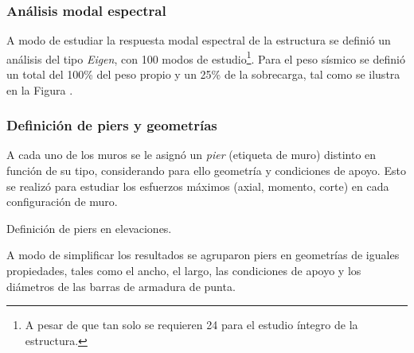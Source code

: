 \subsubsection{Análisis modal espectral}

    A modo de estudiar la respuesta modal espectral de la estructura se definió un análisis del tipo \textit{Eigen}, con 100 modos de estudio\footnote{A pesar de que tan solo se requieren 24 para el estudio íntegro de la estructura.}. Para el peso sísmico se definió un total del 100\% del peso propio y un 25\% de la sobrecarga, tal como se ilustra en la Figura .
    
    

\subsubsection{Definición de piers y geometrías}

    A cada uno de los muros se le asignó un \textit{pier} (etiqueta de muro) distinto en función de su tipo, considerando para ello geometría y condiciones de apoyo. Esto se realizó para estudiar los esfuerzos máximos (axial, momento, corte) en cada configuración de muro.
    
    
    \begin{images}{Definición de piers en elevaciones.}
    \end{images}
    
    A modo de simplificar los resultados se agruparon piers en geometrías de iguales propiedades, tales como el ancho, el largo, las condiciones de apoyo y los diámetros de las barras de armadura de punta.
    
